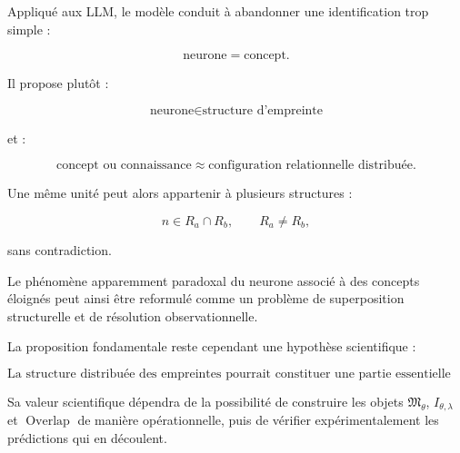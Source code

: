 \documentclass[11pt,a4paper]{article}
\begin{document}
Appliqué aux LLM, le modèle conduit à abandonner une identification trop
simple :

\[
\text{neurone}=\text{concept}.
\]

Il propose plutôt :

\[
\boxed{
\text{neurone}
\in
\text{structure d'empreinte}
}
\]

et :

\[
\boxed{
\text{concept ou connaissance}
\approx
\text{configuration relationnelle distribuée}.
}
\]

Une même unité peut alors appartenir à plusieurs structures :

\[
n\in R_a\cap R_b,
\qquad
R_a\neq R_b,
\]

sans contradiction.

Le phénomène apparemment paradoxal du neurone associé à des concepts
éloignés peut ainsi être reformulé comme un problème de superposition
structurelle et de résolution observationnelle.

La proposition fondamentale reste cependant une hypothèse scientifique :

\[
\boxed{
\text{La structure distribuée des empreintes pourrait constituer
une partie essentielle de l'explication de la boîte noire des LLM.}
}
\]

Sa valeur scientifique dépendra de la possibilité de construire les objets
$\mathfrak M_\theta$, $I_{\theta,\lambda}$ et
$\operatorname{Overlap}$ de manière opérationnelle, puis de vérifier
expérimentalement les prédictions qui en découlent.
    
\end{document}
